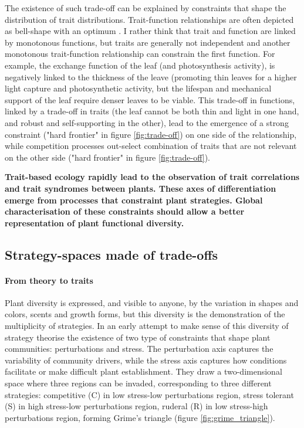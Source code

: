 The existence of such trade-off can be explained by constraints that shape the distribution of trait distributions. Trait-function relationships are often depicted as bell-shape with an optimum \parencite{albert_intraspecific_2010}. I rather think that trait and function are linked by monotonous functions, but traits are generally not independent and another monotonous trait-function relationship can constrain the first function. For example, the exchange function of the leaf (and photosynthesis activity), is negatively linked to the thickness of the leave (promoting thin leaves for a higher light capture and photosynthetic activity, but the lifespan and mechanical support of the leaf require denser leaves to be viable. This trade-off in functions, linked by a trade-off in traits (the leaf cannot be both thin and light in one hand, and robust and self-supporting in the other), lead to the emergence of a strong constraint ("hard frontier" in figure \ref{fig:trade-off}) on one side of the relationship, while competition processes out-select combination of traits that are not relevant on the other side ("hard frontier" in figure \ref{fig:trade-off}).



\textbf{Trait-based ecology rapidly lead to the observation of trait correlations and trait syndromes between plants. These axes of differentiation emerge from processes that constraint plant strategies. Global characterisation of these constraints should allow a better representation of plant functional diversity.}

\subsection{Strategy-spaces made of trade-offs}

\paragraph{From theory to traits}

Plant diversity is expressed, and visible to anyone, by the variation in shapes and colors, scents and growth forms, but this diversity is the demonstration of the multiplicity of strategies. In an early attempt to make sense of this diversity of strategy \cite{grime_evidence_1977} theorise the existence of two type of constraints that shape plant communities: perturbations and stress. The perturbation axis captures the variability of community drivers, while the stress axis captures how conditions facilitate or make difficult plant establishment. They draw a two-dimensional space where three regions can be invaded, corresponding to three different strategies: competitive (C) in low stress-low perturbations region, stress tolerant (S) in high stress-low perturbations region, ruderal (R) in low stress-high perturbations region, forming Grime's triangle (\see figure \ref{fig:grime_triangle}).


